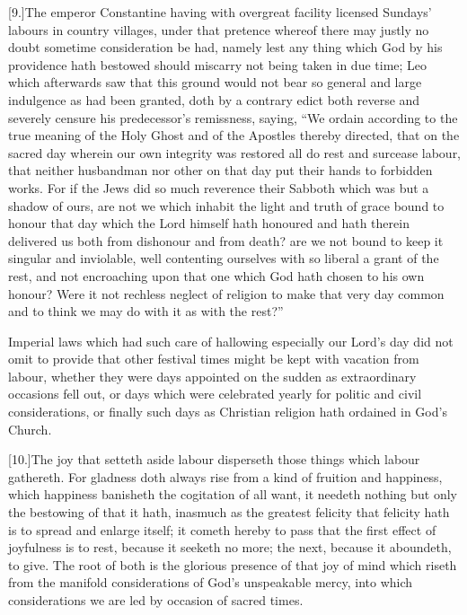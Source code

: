 [9.]The emperor Constantine having with overgreat facility licensed Sundays’ labours in country villages, under that pretence whereof there may justly no doubt sometime consideration be had, namely lest any thing which God by his providence hath bestowed should miscarry not being taken in due  time; Leo which afterwards saw that this ground would not bear so general and large indulgence as had been granted, doth by a contrary edict both reverse and severely censure his predecessor’s remissness, saying, “We ordain according to the true meaning of the Holy Ghost and of the Apostles thereby directed, that on the sacred day wherein our own integrity was restored all do rest and surcease labour, that neither husbandman nor other on that day put their hands to forbidden works. For if the Jews did so much reverence their Sabboth which was but a shadow of ours, are not we which inhabit the light and truth of grace bound to honour that day which the Lord himself hath honoured and hath therein delivered us both from dishonour and from death? are we not bound to keep it singular and inviolable, well contenting ourselves with so liberal a grant of the rest, and not encroaching upon that one which God hath chosen to his own honour? Were it not rechless neglect of religion to make that very day common and to think we may do with it as with the rest?”

Imperial laws which had such care of hallowing especially our Lord’s day did not omit to provide that other festival  times might be kept with vacation from labour,
 whether they were days appointed on the sudden as extraordinary occasions fell out, or days which were celebrated yearly for politic and civil considerations, or finally such days as Christian religion hath ordained in God’s Church.

[10.]The joy that setteth aside labour disperseth those things which labour gathereth. For gladness doth always rise from a kind of fruition and happiness, which happiness banisheth the cogitation of all want, it needeth nothing but only the bestowing of that it hath, inasmuch as the greatest felicity that felicity hath is to spread and enlarge itself; it cometh hereby to pass that the first effect of joyfulness is to rest, because it seeketh no more; the next, because it aboundeth, to give. The root of both is the glorious presence of that joy of mind which riseth from the manifold considerations of God’s unspeakable mercy, into which considerations we are led by occasion of sacred times.

